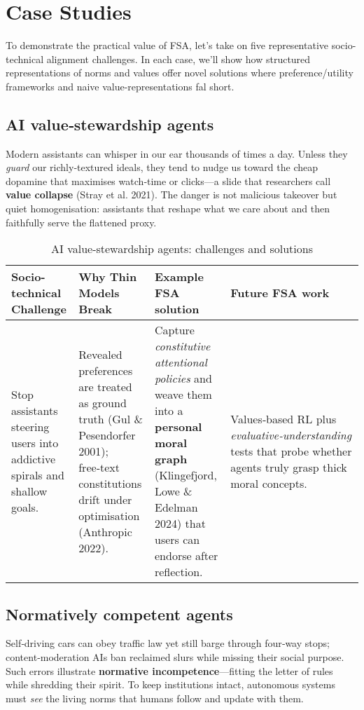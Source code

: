 \section{Case Studies}
To demonstrate the practical value of FSA, let's take on five representative socio-technical alignment challenges. In each case, we'll show how structured representations of norms and values offer novel solutions where preference/utility frameworks and naive value-representations fal short.

\subsection{AI value‑stewardship agents}
Modern assistants can whisper in our ear thousands of times a day. Unless they \textit{guard} our richly‑textured ideals, they tend to nudge us toward the cheap dopamine that maximises watch‑time or clicks—a slide that researchers call \textbf{value collapse} (Stray et al. 2021). The danger is not malicious takeover but quiet homogenisation: assistants that reshape what we care about and then faithfully serve the flattened proxy.

\begin{table*}[!htbp]
    \centering
    \small
    \begin{tabular}{p{}p{}p{}p{}}
        \toprule
        \textbf{Socio-technical Challenge} & \textbf{Why Thin Models Break} & \textbf{Example FSA solution} & \textbf{Future FSA work} \\
        \midrule
        Stop assistants steering users into addictive spirals and shallow goals. &
        Revealed preferences are treated as ground truth (Gul \& Pesendorfer 2001); free‑text constitutions drift under optimisation (Anthropic 2022). &
        Capture \textit{constitutive attentional policies} and weave them into a \textbf{personal moral graph} (Klingefjord, Lowe \& Edelman 2024) that users can endorse after reflection. &
        Values‑based RL plus \textit{evaluative‑understanding} tests that probe whether agents truly grasp thick moral concepts. \\
        \bottomrule
    \end{tabular}
    \caption{AI value-stewardship agents: challenges and solutions}
    \label{tab:value-stewardship}
\end{table*}

\subsection{Normatively competent agents}
Self‑driving cars can obey traffic law yet still barge through four‑way stops; content‑moderation AIs ban reclaimed slurs while missing their social purpose. Such errors illustrate \textbf{normative incompetence}—fitting the letter of rules while shredding their spirit. To keep institutions intact, autonomous systems must \textit{see} the living norms that humans follow and update with them.

